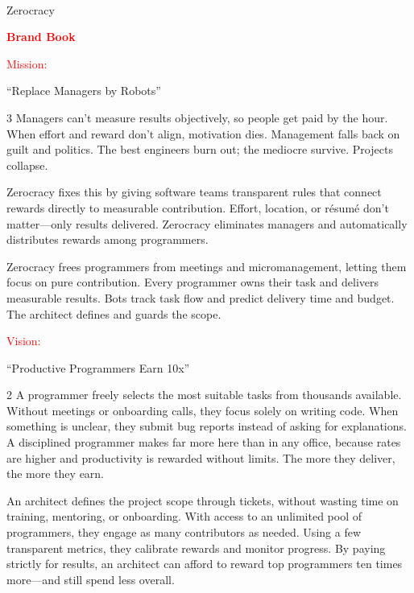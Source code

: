 \documentclass{article}
\newcommand\slide[1]{%
  \pagebreak\topskip0pt\vspace*{\fill}%
  \begin{center}\LARGE%
  #1
  \end{center}%
  \vspace*{\fill}}
\newcommand\header[1]{{\LARGE\textcolor{red}{#1:}\\[1em]\par}}
\newcommand\intro{\rmfamily\normalsize\raggedright\setlength{\parindent}{1.5em}}
\begin{document}
\color{black}

\sffamily

\slide{%
  \\
  Zerocracy
  \\[2em]
  {\large\textcolor{red}{\textbf{Brand Book}}\par}}

\slide{
  \header{Mission}
  \par
  {\Huge \enquote{Replace Managers by Robots}\par}
  \vspace{1em}
  {\intro\begin{multicols}{3}
  Managers can't measure results objectively, so people get paid by the hour.
  When effort and reward don't align, motivation dies.
  Management falls back on guilt and politics.
  The best engineers burn out; the mediocre survive.
  Projects collapse.
  \par\columnbreak\par
  Zerocracy fixes this by giving software teams transparent rules that connect rewards directly to measurable contribution.
  Effort, location, or r\'{e}sum\'{e} don't matter---only results delivered.
  Zerocracy eliminates managers and automatically distributes rewards among programmers.
  \par\columnbreak\par
  Zerocracy frees programmers from meetings and micromanagement, letting them focus on pure contribution.
  Every programmer owns their task and delivers measurable results.
  Bots track task flow and predict delivery time and budget.
  The architect defines and guards the scope.
  \end{multicols}\par}}

\slide{
  \header{Vision}
  \par
  {\Huge \enquote{Productive Programmers Earn 10x}\par}
  \vspace{1em}
  {\intro\begin{multicols}{2}
  A programmer freely selects the most suitable tasks from thousands available.
  Without meetings or onboarding calls, they focus solely on writing code.
  When something is unclear, they submit bug reports instead of asking for explanations.
  A disciplined programmer makes far more here than in any office, because rates are higher and productivity is rewarded without limits.
  The more they deliver, the more they earn.
  \par\columnbreak\par
  An architect defines the project scope through tickets, without wasting time on training, mentoring, or onboarding.
  With access to an unlimited pool of programmers, they engage as many contributors as needed.
  Using a few transparent metrics, they calibrate rewards and monitor progress.
  By paying strictly for results, an architect can afford to reward top programmers ten times more---and still spend less overall.
  \end{multicols}\par}}
\end{document}
